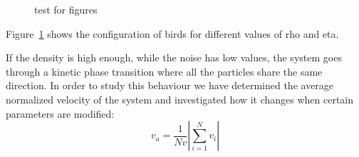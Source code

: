 \documentclass[twoside,twocolumn]{article}
\begin{document}
\begin{figure}[!htb]
	\caption{test for figures}
  \label{fig:configs}
\end{figure}

Figure~\ref{fig:configs} shows the configuration of birds for different values of rho and eta.

If the density is high enough, while the noise has low values, the system goes through a kinetic phase transition where all the particles share the same direction. In order to study this behaviour we have determined the average normalized velocity of the system and investigated how it changes when certain parameters are modified:
\begin{equation}
v_a=\frac{1}{Nv}\left\vert\sum_{i=1}^{N} v_i\right\vert
\end{equation}
\end{document}
